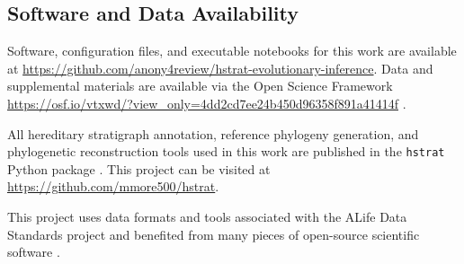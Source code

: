 \subsection{Software and Data Availability}

Software, configuration files, and executable notebooks for this work are available at \url{https://github.com/anony4review/hstrat-evolutionary-inference}.
Data and supplemental materials are available via the Open Science Framework \url{https://osf.io/vtxwd/?view_only=4dd2cd7ee24b450d96358f891a41414f} \citep{foster2017open}.

All hereditary stratigraph annotation, reference phylogeny generation, and phylogenetic reconstruction tools used in this work are published in the \texttt{hstrat} Python package  \citep{moreno2022hstrat}. 
This project can be visited at \url{https://github.com/mmore500/hstrat}.

This project uses data formats and tools associated with the ALife Data Standards project \citep{lalejini2019data} and benefited from many pieces of open-source scientific software \cite{ofria2020empirical,sand2014tqdist,2020SciPy-NMeth,harris2020array,reback2020pandas,mckinney-proc-scipy-2010,sukumaran2010dendropy,cock2009biopython}.





